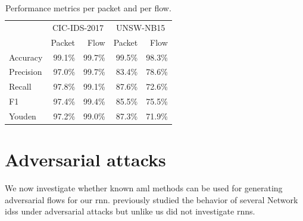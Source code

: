 \documentclass[conference]{IEEEtran}
\begin{document}
\begin{table}
\caption{Performance metrics per packet and per flow.} \label{tab:performance_results}
\centering
\begin{tabular}{l r r r r} \toprule
& \multicolumn{2}{c}{CIC-IDS-2017} & \multicolumn{2}{c}{UNSW-NB15} \\
	&	Packet	&	Flow	&	Packet	&	Flow	\\	\midrule
Accuracy	&	99.1\%	&	99.7\%	&	99.5\%	&	98.3\%	\\
Precision	&	97.0\%	&	99.7\%	&	83.4\%	&	78.6\%	\\
Recall	&	97.8\%	&	99.1\%	&	87.6\%	&	72.6\%	\\
F1	&	97.4\%	&	99.4\%	&	85.5\%	&	75.5\%	\\
Youden	&	97.2\%	&	99.0\%	&	87.3\%	&	71.9\%	\\
\bottomrule
\end{tabular}
\end{table}

\section{Adversarial attacks}
\label{sec:adv}
We now investigate whether known \gls{aml} methods can be used for generating adversarial flows for our \gls{rnn}. \cite{hashemi_towards_2019} previously studied the behavior of several Network \glspl{ids} under adversarial attacks but unlike us did not investigate \glspl{rnn}.
\end{document}
